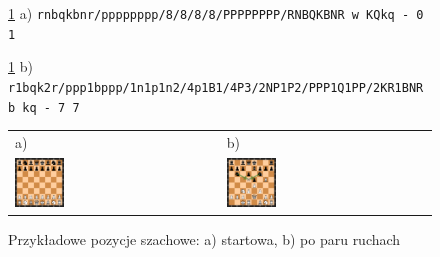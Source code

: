 \begin{figure}[ht]
    \centering
    \centerline{
        \ref{fig: basic_chess_positions} a) \lstset{basicstyle=\ttfamily}\lstinline{rnbqkbnr/pppppppp/8/8/8/8/PPPPPPPP/RNBQKBNR w KQkq - 0 1}
    }
    \centerline{
        \ref{fig: basic_chess_positions} b) \lstset{basicstyle=\ttfamily}\lstinline{r1bqk2r/ppp1bppp/1n1p1n2/4p1B1/4P3/2NP1P2/PPP1Q1PP/2KR1BNR b kq - 7 7}
    }
    \begin{tabular}{@{}ll@{}}
        a) & b) \\
        \includegraphics[width=0.25\textwidth]{rozdzialy/rozdzial01/1_komunikacja-z-systemem/rysunki/pozycja_startowa}
        &
        \includegraphics[width=0.25\textwidth]{rozdzialy/rozdzial01/1_komunikacja-z-systemem/rysunki/pozycja_niejasna}
    \end{tabular}
    \caption{Przykładowe pozycje szachowe: a) startowa, b) po paru ruchach}
    \label{fig: basic_chess_positions}

\end{figure}

